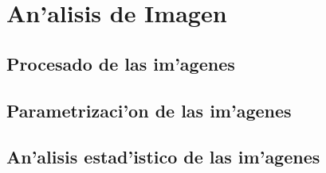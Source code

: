 

\chapter{An'alisis de Imagen}
\label{chapter:imageana}

\section{Procesado de las im'agenes}

\section{Parametrizaci'on de las im'agenes}

\section{An'alisis estad'istico de las im'agenes}

\endinput
%


